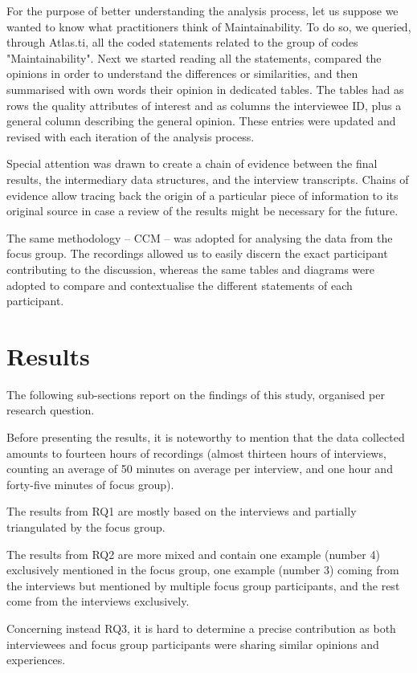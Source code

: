 For the purpose of better understanding the analysis process, let us suppose we wanted to know what practitioners think of Maintainability. 
To do so, we queried, through Atlas.ti, all the coded statements related to the group of codes "Maintainability". Next we started reading all the statements, compared the opinions in order to understand the differences or similarities, and then summarised with own words their opinion in dedicated tables.
The tables had as rows the quality attributes of interest and as columns the interviewee ID, plus a general column describing the general opinion.
These entries were updated and revised with each iteration of the analysis process.

Special attention was drawn to create a chain of evidence between the final results, the intermediary data structures, and the interview transcripts.
Chains of evidence allow tracing back the origin of a particular piece of information to its original source in case a review of the results might be necessary for the future.

The same methodology -- CCM -- was adopted for analysing the data from the focus group.
The recordings allowed us to easily discern the exact participant contributing to the discussion, whereas the same tables and diagrams were adopted to compare and contextualise the different statements of each participant.

\section{Results}\label{c7:sec:results}
The following sub-sections report on the findings of this study, organised per research question.

Before presenting the results, it is noteworthy to mention that the data collected amounts to fourteen hours of recordings (almost thirteen hours of interviews, counting an average of 50 minutes on average per interview, and one hour and forty-five minutes of focus group).

The results from RQ1 are mostly based on the interviews and partially triangulated by the focus group.

The results from RQ2 are more mixed and contain one example (number 4) exclusively mentioned in the focus group, one example (number 3) coming from the interviews but mentioned by multiple focus group participants, and the rest come from the interviews exclusively.

Concerning instead RQ3, it is hard to determine a precise contribution as both interviewees and focus group participants were sharing similar opinions and experiences.

